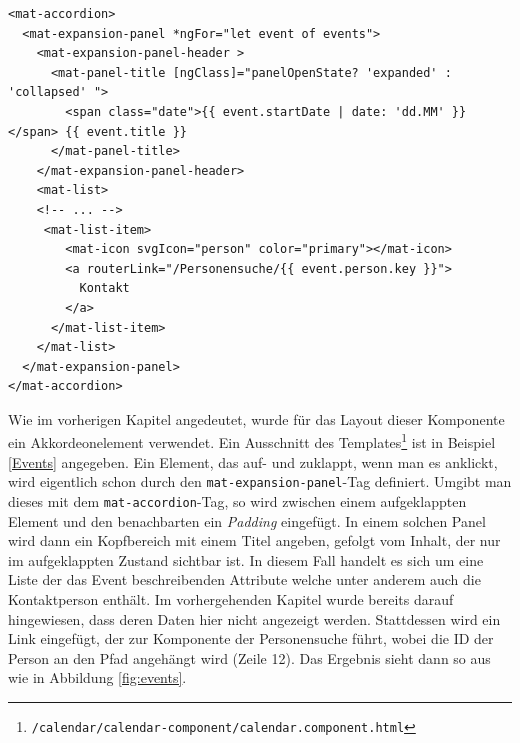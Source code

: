 \begin{lstlisting}[float, floatplacement=h, style=htmlcssjs, caption={Ausschnitt des Templates der }, label={Events}]
<mat-accordion>
  <mat-expansion-panel *ngFor="let event of events">
    <mat-expansion-panel-header >
      <mat-panel-title [ngClass]="panelOpenState? 'expanded' : 'collapsed' ">
        <span class="date">{{ event.startDate | date: 'dd.MM' }}</span> {{ event.title }}
      </mat-panel-title>
    </mat-expansion-panel-header>
    <mat-list>
    <!-- ... -->
     <mat-list-item>
        <mat-icon svgIcon="person" color="primary"></mat-icon>
        <a routerLink="/Personensuche/{{ event.person.key }}">
          Kontakt
        </a>
      </mat-list-item> 
    </mat-list>
  </mat-expansion-panel>
</mat-accordion>
\end{lstlisting}
Wie im vorherigen Kapitel angedeutet, wurde für das Layout dieser Komponente ein Akkordeonelement verwendet. Ein Ausschnitt des Templates\footnote{\texttt{/calendar/calendar-component/calendar.component.html}} ist in Beispiel \ref{Events} angegeben. Ein Element, das auf- und zuklappt, wenn man es anklickt, wird eigentlich schon durch den \texttt{mat-expansion-panel}-Tag definiert. Umgibt man dieses mit dem \texttt{mat-accordion}-Tag, so wird zwischen einem aufgeklappten Element und den benachbarten ein \textit{Padding} eingefügt. In einem solchen Panel wird dann ein Kopfbereich mit einem Titel angeben, gefolgt vom Inhalt, der nur im aufgeklappten Zustand sichtbar ist. In diesem Fall handelt es sich um eine Liste der das Event beschreibenden Attribute welche unter anderem auch die Kontaktperson enthält. Im vorhergehenden Kapitel wurde bereits darauf hingewiesen, dass deren Daten hier nicht angezeigt werden. Stattdessen wird ein Link eingefügt, der zur Komponente der Personensuche führt, wobei die ID der Person an den Pfad angehängt wird (Zeile 12). Das Ergebnis sieht dann so aus wie in Abbildung \ref{fig:events}.

